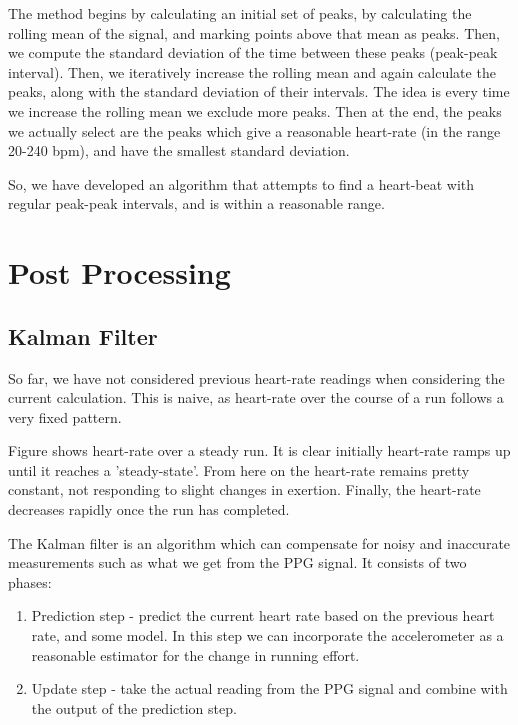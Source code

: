 \documentclass[12pt,a4paper,twoside,openright]{report}
\begin{document}
The method begins by calculating an initial set of peaks, by calculating the
rolling mean of the signal, and marking points above that mean as peaks. Then,
we compute the standard deviation of the time between these peaks (peak-peak
interval). Then, we iteratively increase the rolling mean and again calculate
the peaks, along with
the standard deviation of their intervals. The idea is every time we increase the rolling mean we 
exclude more peaks. Then at the end, the peaks we actually select are the peaks which give a reasonable
heart-rate (in the range 20-240 bpm), and have the smallest standard deviation.

So, we have developed an algorithm that attempts to find a heart-beat with
regular peak-peak intervals, and is within a reasonable range.

\section{Post Processing}

\subsection{Kalman Filter}

So far, we have not considered previous heart-rate readings when considering
the current calculation. This is naive, as heart-rate over the course of a run
follows a very fixed pattern. 

Figure    shows heart-rate over a steady run. It is clear initially heart-rate
ramps up until it reaches a 'steady-state'. From here on the heart-rate
remains pretty constant, not responding to slight changes in exertion.
Finally, the heart-rate decreases rapidly once the run has completed.

The Kalman filter is an algorithm which can compensate for noisy and
inaccurate measurements such as what we get from the PPG signal. It consists
of two phases:
\begin{enumerate}
	\item Prediction step - predict the current heart rate based on the
		previous heart rate, and some model. In this step we can
		incorporate the accelerometer as a reasonable estimator for
		the change in running effort.

	\item Update step - take the actual reading from the PPG signal and combine
		with the output of the prediction step.
\end{enumerate}
\end{document}
